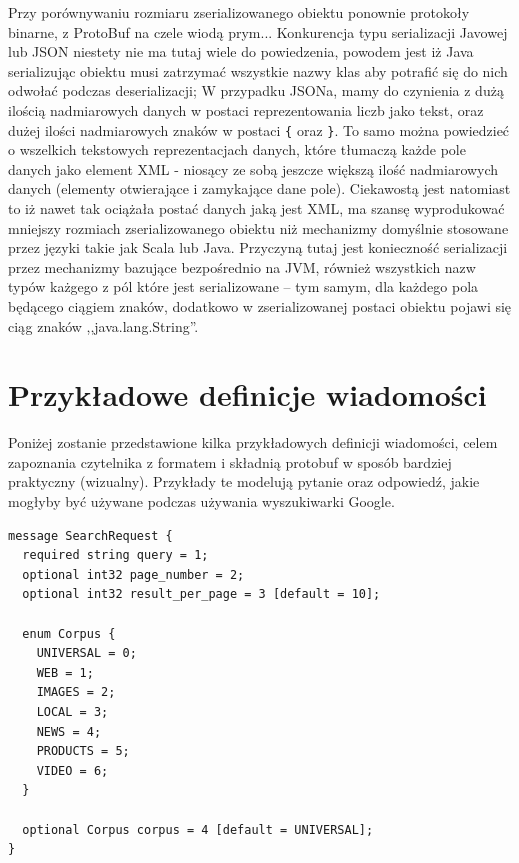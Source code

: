 Przy porównywaniu rozmiaru zserializowanego obiektu ponownie protokoły binarne, z ProtoBuf na czele wiodą prym... 
Konkurencja typu serializacji Javowej lub JSON niestety nie ma tutaj wiele do powiedzenia, powodem jest iż Java serializując obiektu musi
zatrzymać wszystkie nazwy klas aby potrafić się do nich odwołać podczas deserializacji; W przypadku JSONa, mamy do czynienia z dużą ilością nadmiarowych danych
w postaci reprezentowania liczb jako tekst, oraz dużej ilości nadmiarowych znaków w postaci \verb|{| oraz \verb|}|. To samo można powiedzieć o wszelkich
tekstowych reprezentacjach danych, które tłumaczą każde pole danych jako element XML - niosący ze sobą jeszcze większą ilość nadmiarowych danych (elementy
otwierające i zamykające dane pole). Ciekawostą jest natomiast to iż nawet tak ociążała postać danych jaką jest XML, ma szansę wyprodukować mniejszy rozmiach zserializowanego obiektu
niż mechanizmy domyślnie stosowane przez języki takie jak Scala lub Java. Przyczyną tutaj jest konieczność serializacji przez mechanizmy bazujące bezpośrednio na JVM,
również wszystkich nazw typów każgego z pól które jest serializowane -- tym samym, dla każdego pola będącego ciągiem znaków, dodatkowo w zserializowanej postaci
obiektu pojawi się ciąg znaków ,,java.lang.String''.



\section{Przykładowe definicje wiadomości}
\label{sec:proto_file_examples}

Poniżej zostanie przedstawione kilka przykładowych definicji wiadomości, celem zapoznania czytelnika z formatem i składnią protobuf w
sposób bardziej praktyczny (wizualny). Przykłady te modelują pytanie oraz odpowiedź, jakie mogłyby być używane podczas używania wyszukiwarki Google.

\begin{lstlisting}[caption={Definicja wiadomości zawierająca enum oraz wartości domyślne}]
message SearchRequest {
  required string query = 1;
  optional int32 page_number = 2;
  optional int32 result_per_page = 3 [default = 10];

  enum Corpus {
    UNIVERSAL = 0;
    WEB = 1;
    IMAGES = 2;
    LOCAL = 3;
    NEWS = 4;
    PRODUCTS = 5;
    VIDEO = 6;
  }

  optional Corpus corpus = 4 [default = UNIVERSAL];
}
\end{lstlisting}

